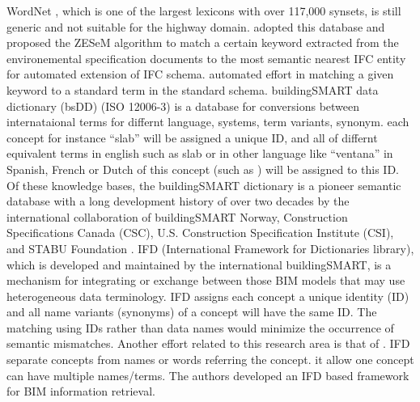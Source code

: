 \documentclass[Journal, BackFigs, DoubleSpace]{ascelike} %
\begin{document}
WordNet \cite{miller95}, which is one of the largest lexicons with over 117,000 synsets, is still generic and not suitable for the highway domain.  adopted this database and proposed the ZESeM algorithm to match a certain keyword extracted from the environemental specification documents to the most semantic nearest IFC entity for automated extension of IFC schema. automated effort in matching a given keyword to a standard term in the standard schema. 
buildingSMART data dictionary (bsDD) (ISO 12006-3) \cite{buildingsmartData} is a database for conversions between internataional terms for differnt language, systems, term variants, synonym. each concept for instance ``slab'' will be assigned a unique ID, and all of differnt equivalent terms in english such as slab or in other language like ``ventana'' in Spanish, French or Dutch of this concept (such as ) will be assigned to this ID. Of these knowledge bases, the buildingSMART dictionary is a pioneer semantic database with a long development history of over two decades by the international collaboration of buildingSMART Norway, Construction Specifications Canada (CSC), U.S. Construction Specification Institute (CSI), and STABU Foundation \cite{hezik08}. IFD (International Framework for Dictionaries library), which is developed and maintained by the international buildingSMART, is a mechanism for integrating or exchange between those BIM models that may use heterogeneous data terminology. IFD assigns each concept a unique identity (ID) and all name variants (synonyms) of a concept will have the same ID. The matching using IDs rather than data names would minimize the occurrence of semantic mismatches. Another effort related to this research area is that of . IFD separate concepts from names or words referring the concept. it allow one concept can have multiple names/terms. The authors developed an IFD based framework for BIM information retrieval.
%
\end{document}
